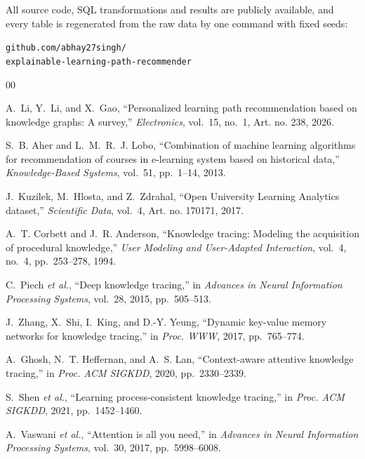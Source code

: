 \documentclass[conference]{IEEEtran}
\begin{document}
All source code, SQL transformations and results are publicly available, and every table
is regenerated from the raw data by one command with fixed seeds:

{\raggedright\small\texttt{github.com/abhay27singh/}\\
\texttt{explainable-learning-path-recommender}\par}

\begin{thebibliography}{00}

A.~Li, Y.~Li, and X.~Gao, ``Personalized learning path recommendation based on knowledge
graphs: A survey,'' \emph{Electronics}, vol.~15, no.~1, Art. no. 238, 2026.

S.~B. Aher and L.~M.~R.~J. Lobo, ``Combination of machine learning algorithms for
recommendation of courses in e-learning system based on historical data,''
\emph{Knowledge-Based Systems}, vol.~51, pp.~1--14, 2013.

J.~Kuzilek, M.~Hlosta, and Z.~Zdrahal, ``Open University Learning Analytics dataset,''
\emph{Scientific Data}, vol.~4, Art. no. 170171, 2017.

A.~T. Corbett and J.~R. Anderson, ``Knowledge tracing: Modeling the acquisition of
procedural knowledge,'' \emph{User Modeling and User-Adapted Interaction}, vol.~4, no.~4,
pp.~253--278, 1994.

C.~Piech \emph{et al.}, ``Deep knowledge tracing,'' in \emph{Advances in Neural Information
Processing Systems}, vol.~28, 2015, pp.~505--513.

J.~Zhang, X.~Shi, I.~King, and D.-Y. Yeung, ``Dynamic key-value memory networks for
knowledge tracing,'' in \emph{Proc. WWW}, 2017, pp.~765--774.

A.~Ghosh, N.~T. Heffernan, and A.~S. Lan, ``Context-aware attentive knowledge tracing,''
in \emph{Proc. ACM SIGKDD}, 2020, pp.~2330--2339.

S.~Shen \emph{et al.}, ``Learning process-consistent knowledge tracing,'' in \emph{Proc.
ACM SIGKDD}, 2021, pp.~1452--1460.

A.~Vaswani \emph{et al.}, ``Attention is all you need,'' in \emph{Advances in Neural
Information Processing Systems}, vol.~30, 2017, pp.~5998--6008.


\end{thebibliography}
\end{document}
